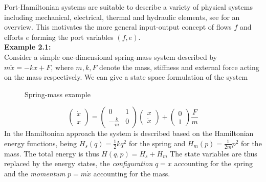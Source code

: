 \documentclass[a4paper,twoside, openright,12pt]{report}
\begin{document}
Port-Hamiltonian systems are suitable to describe a variety of physical systems including mechanical, electrical, thermal and hydraulic elements, see \cite{duindam2009geoplexbook} for an overview. This motivates the more general input-output concept of flows $f$ and efforts $e$ forming the port variables $(f,e)$.\\
\textbf{Example 2.1:}\\
Consider a simple one-dimensional spring-mass system described by $ m\ddot{x} = -kx +F $, where $ m,k,F $ denote the mass, stiffness and external force acting on the mass respectively. We can give a state space formulation of the system
\begin{figure}[b!]
	\centering
	\small
	\def\svgwidth{0.5\columnwidth}
	
	\caption[Spring-mass example]{Spring-mass example}
	\label{FIG:springmass}
\end{figure}
\begin{equation}
	\begin{pmatrix}\dot{x} \\ \ddot{x}\end{pmatrix} =
	\begin{pmatrix}0 & 1 \\ -\frac{k}{m} & 0\end{pmatrix}
	\begin{pmatrix}x \\ \dot{x}\end{pmatrix} + 
	\begin{pmatrix}0 \\ 1\end{pmatrix}\frac{F}{m}
\end{equation}
In the Hamiltonian approach the system is described based on the Hamiltonian energy functions, being $ H_s(q) = \frac{1}{2}kq^2 $ for the spring and $ H_m(p) = \frac{1}{2m}p^2 $ for the mass. The total energy is thus $H(q,p) = H_s + H_m$ The state variables are thus replaced by the energy states, the \emph{configuration} $q=x$ accounting for the spring and the \emph{momentum} $p=m\dot{x}$ accounting for the mass.  
\end{document}
